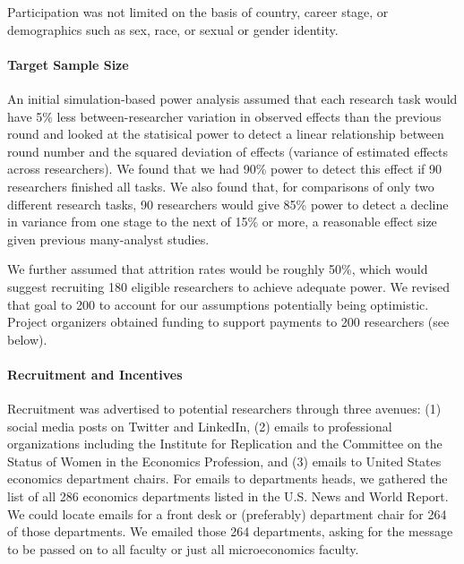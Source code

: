 \documentclass[
  letterpaper,
  DIV=11,
  numbers=noendperiod]{scrartcl}
\let\oldparagraph\paragraph
\renewcommand{\paragraph}[1]{\oldparagraph{#1}\mbox{}}
\begin{document}
Participation was not limited on the basis of country, career stage, or
demographics such as sex, race, or sexual or gender identity.

\hypertarget{target-sample-size}{%
\paragraph{Target Sample Size}\label{target-sample-size}}

\label{sec-target-sample}

An initial simulation-based power analysis assumed that each research
task would have 5\% less between-researcher variation in observed
effects than the previous round and looked at the statisical power to
detect a linear relationship between round number and the squared
deviation of effects (variance of estimated effects across researchers).
We found that we had 90\% power to detect this effect if 90 researchers
finished all tasks. We also found that, for comparisons of only two
different research tasks, 90 researchers would give 85\% power to detect
a decline in variance from one stage to the next of 15\% or more, a
reasonable effect size given previous many-analyst studies.

We further assumed that attrition rates would be roughly 50\%, which
would suggest recruiting 180 eligible researchers to achieve adequate
power. We revised that goal to 200 to account for our assumptions
potentially being optimistic. Project organizers obtained funding to
support payments to 200 researchers (see below).

\hypertarget{recruitment-and-incentives}{%
\paragraph{Recruitment and
Incentives}\label{recruitment-and-incentives}}

Recruitment was advertised to potential researchers through three
avenues: (1) social media posts on Twitter and LinkedIn, (2) emails to
professional organizations including the Institute for Replication and
the Committee on the Status of Women in the Economics Profession, and
(3) emails to United States economics department chairs. For emails to
departments heads, we gathered the list of all 286 economics departments
listed in the U.S. News and World Report. We could locate emails for a
front desk or (preferably) department chair for 264 of those
departments. We emailed those 264 departments, asking for the message to
be passed on to all faculty or just all microeconomics faculty.
\end{document}
